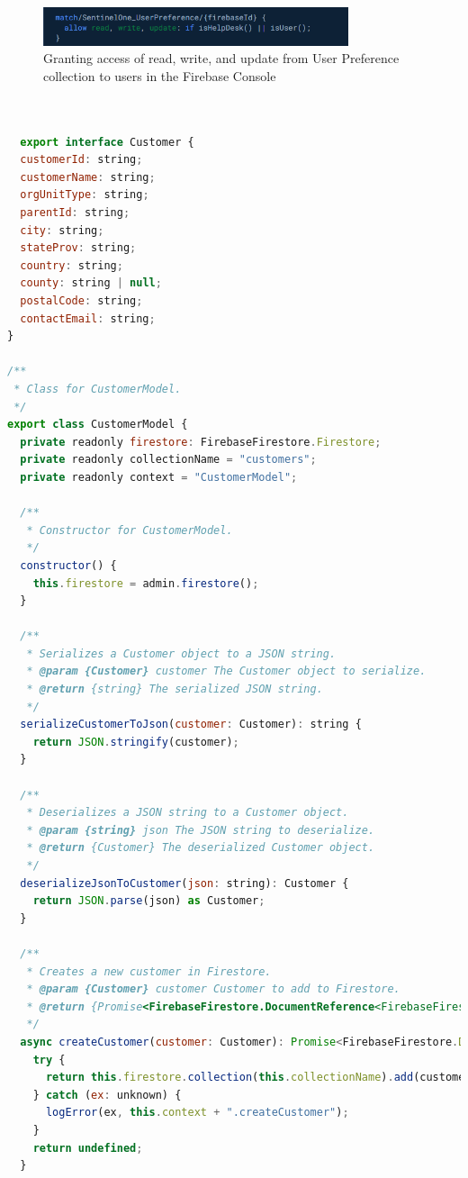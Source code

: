 \begin{figure}[htbp]
  \centering
  \includegraphics[width=0.8\textwidth]{Figures/User Preference.png}
  \caption{Granting access of read, write, and update from User Preference collection to users in the Firebase Console}
\end{figure}


\begin{lstlisting}[language=JavaScript, caption={Model class in the back-end}]


  export interface Customer {
  customerId: string;
  customerName: string;
  orgUnitType: string;
  parentId: string;
  city: string;
  stateProv: string;
  country: string;
  county: string | null;
  postalCode: string;
  contactEmail: string;
}

/**
 * Class for CustomerModel.
 */
export class CustomerModel {
  private readonly firestore: FirebaseFirestore.Firestore;
  private readonly collectionName = "customers";
  private readonly context = "CustomerModel";

  /**
   * Constructor for CustomerModel.
   */
  constructor() {
    this.firestore = admin.firestore();
  }

  /**
   * Serializes a Customer object to a JSON string.
   * @param {Customer} customer The Customer object to serialize.
   * @return {string} The serialized JSON string.
   */
  serializeCustomerToJson(customer: Customer): string {
    return JSON.stringify(customer);
  }

  /**
   * Deserializes a JSON string to a Customer object.
   * @param {string} json The JSON string to deserialize.
   * @return {Customer} The deserialized Customer object.
   */
  deserializeJsonToCustomer(json: string): Customer {
    return JSON.parse(json) as Customer;
  }

  /**
   * Creates a new customer in Firestore.
   * @param {Customer} customer Customer to add to Firestore.
   * @return {Promise<FirebaseFirestore.DocumentReference<FirebaseFirestore.DocumentData>> | undefined}.
   */
  async createCustomer(customer: Customer): Promise<FirebaseFirestore.DocumentReference<FirebaseFirestore.DocumentData> | undefined> {
    try {
      return this.firestore.collection(this.collectionName).add(customer);
    } catch (ex: unknown) {
      logError(ex, this.context + ".createCustomer");
    }
    return undefined;
  }


\end{lstlisting}
